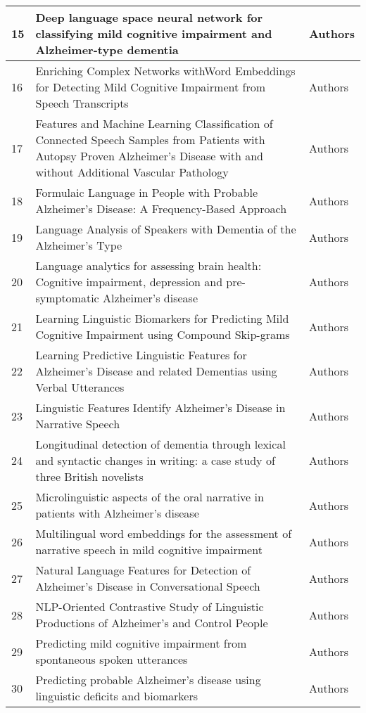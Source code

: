 \documentclass[12pt]{article}
\begin{document}
\begin{longtable}{ p{1cm} | p{6cm} | p{6cm}}
	15 & Deep language space neural network for classifying mild cognitive impairment and Alzheimer-type dementia & Authors \\ \hline
	16 & Enriching Complex Networks withWord Embeddings for Detecting Mild Cognitive Impairment from Speech Transcripts & Authors \\ \hline
	17 & Features and Machine Learning Classification of Connected Speech Samples from Patients with Autopsy Proven Alzheimer’s Disease with and without Additional Vascular Pathology & Authors \\ \hline
	18 & Formulaic Language in People with Probable Alzheimer’s Disease: A Frequency-Based Approach & Authors \\ \hline
	19 & Language Analysis of Speakers with Dementia of the Alzheimer’s Type & Authors \\ \hline
	20 & Language analytics for assessing brain health: Cognitive impairment, depression and pre-symptomatic Alzheimer's disease & Authors \\ \hline
	21 & Learning Linguistic Biomarkers for Predicting Mild Cognitive Impairment using Compound Skip-grams & Authors \\ \hline
	22 & Learning Predictive Linguistic Features for Alzheimer’s Disease and related Dementias using Verbal Utterances & Authors \\ \hline
	23 & Linguistic Features Identify Alzheimer's Disease in Narrative Speech & Authors \\ \hline
	24 & Longitudinal detection of dementia through lexical and syntactic changes in writing: a case study of three British novelists & Authors \\ \hline
	25 & Microlinguistic aspects of the oral narrative in patients with Alzheimer’s disease & Authors \\ \hline
	26 & Multilingual word embeddings for the assessment of narrative speech in mild cognitive impairment & Authors \\ \hline
	27 & Natural Language Features for Detection of Alzheimer's Disease in Conversational Speech & Authors \\ \hline
	28 & NLP-Oriented Contrastive Study of Linguistic Productions of Alzheimer's and Control People & Authors \\ \hline
	29 & Predicting mild cognitive impairment from spontaneous spoken utterances & Authors \\ \hline
	30 & Predicting probable Alzheimer's disease using linguistic deficits and biomarkers & Authors \\ \hline

\end{longtable}
\end{document}
